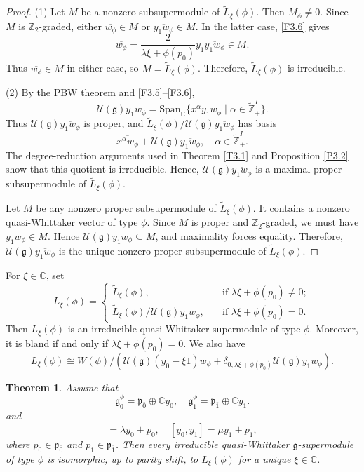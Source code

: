 \documentclass[12pt,reqno]{article}
\newtheorem{thm}{Theorem}[section]
\def\o{\overline}
\def\a{\alpha}
\def\la{\lambda}
\def\F{\mathfrak}
\def\r{\mathrm}
\def\C{\mathcal}
\def\CC{\mathbb{C}}
\def\ZZ{\mathbb{Z}}
\def\beqn{\begin{equation*}}
\def\eeqn{\end{equation*}}
\def\beq{\begin{equation}}
\def\eeq{\end{equation}}
\def\({\left(}
\def\){\right)}
\begin{document}
 
\begin{proof}
(1) Let $M$ be a nonzero subsupermodule of $\widetilde{L}_\xi(\phi)$. Then $M_\phi\neq0$. Since $M$ is $\ZZ_2$-graded, either $\o{w_\phi}\in M$ or $\o{y_1w_\phi}\in M$. In the latter case, \eqref{F3.6} gives
\beqn
\o{w_\phi}=\frac{2}{\la\xi+\phi(p_0)}y_1\o{y_1w_\phi}\in M.
\eeqn	
Thus $\o{w_\phi}\in M$ in either case, so $M=\widetilde{L}_\xi(\phi)$. Therefore, $\widetilde{L}_\xi(\phi)$ is irreducible.

(2) By the PBW theorem and \eqref{F3.5}--\eqref{F3.6},
\beqn
\C{U}(\F{g})\o{y_1w_\phi}=\r{Span}_\CC\{\o{x^\a y_1w_\phi}\mid \a\in\widetilde{\ZZ}_+^I\}.
\eeqn
Thus $\C{U}(\F{g})\o{y_1w_\phi}$ is proper, and $\widetilde{L}_\xi(\phi)/\C{U}(\F{g})\o{y_1w_\phi}$ has basis
\beqn
\o{x^\a w_\phi}+\C{U}(\F{g})\o{y_1w_\phi},\quad \a\in\widetilde{\ZZ}_+^I.
\eeqn
The degree-reduction arguments used in Theorem \ref{T3.1} and Proposition \ref{P3.2} show that this quotient is irreducible. Hence, $\C{U}(\F{g})\o{y_1w_\phi}$ is a maximal proper subsupermodule of $\widetilde{L}_\xi(\phi)$.

Let $M$ be any nonzero proper subsupermodule of $\widetilde{L}_\xi(\phi)$. It contains a nonzero quasi-Whittaker vector of type $\phi$. Since $M$ is proper and $\ZZ_2$-graded, we must have $\o{y_1w_\phi}\in M$. Hence $\C{U}(\F{g})\o{y_1w_\phi}\subseteq M$, and maximality forces equality. Therefore, $\C{U}(\F{g})\o{y_1w_\phi}$ is the unique nonzero proper subsupermodule of $\widetilde{L}_\xi(\phi)$.
\end{proof}


For $\xi\in\CC$, set 
\beq
L_\xi(\phi)=\begin{cases}
	\widetilde{L}_\xi(\phi),\quad &\text{if~}\la\xi+\phi(p_0)\neq0;\\
	\widetilde{L}_\xi(\phi)/\C{U}(\F{g})\o{y_1w_\phi},\quad & \text{if~}\la\xi+\phi(p_0)=0.
\end{cases}
\eeq
Then $L_\xi(\phi)$ is an irreducible quasi-Whittaker supermodule of type $\phi$. Moreover, it is bland if and only if $\la\xi+\phi(p_0)=0$. We also have
\beq\label{F3}
L_\xi(\phi)\cong W(\phi)\big/\(\C{U}(\F{g})(y_0-\xi1)w_\phi+\delta_{0,\la\xi+\phi(p_0)}\C{U}(\F{g})y_1w_\phi\).
\eeq



\begin{thm}\label{T3.10}
Assume that
\beqn
\F{g}^\phi_{\o{0}}=\F{p}_{\o{0}}\oplus\CC y_0,\quad \F{g}^\phi_{\o{1}}=\F{p}_{\o{1}}\oplus\CC y_1.
\eeqn
and
\beqn
[y_1,y_1]=\la y_0+p_0,\quad [y_0,y_1]=\mu y_1+p_1,
\eeqn
where $p_0\in\F{p}_{\o{0}}$ and $p_1\in\F{p}_{\o{1}}$. Then every irreducible quasi-Whittaker $\F{g}$-supermodule of type $\phi$ is isomorphic, up to parity shift, to $L_\xi(\phi)$ for a unique $\xi\in\CC$.
\end{thm}
\end{document}
